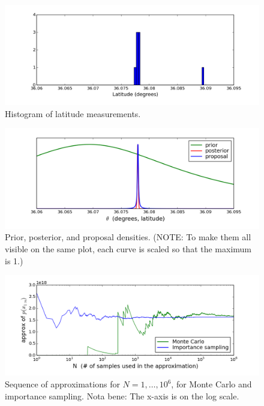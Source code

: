 \documentclass[12pt]{article}
\begin{document}
\begin{figure}
  \begin{center}
    \includegraphics[trim=0 0.75cm 0 0, clip, width=1\textwidth]{gps-histogram.png}
  \end{center}
  \caption{Histogram of latitude measurements.}
  \label{figure:gps-histogram}
\end{figure}

\begin{figure}
  \begin{center}
    \includegraphics[trim=0 0.65cm 0 0, clip, width=1\textwidth]{gps-curves.png}
  \end{center}
  \caption{Prior, posterior, and proposal densities. (NOTE: To make them all visible on the same plot, each curve is scaled so that the maximum is 1.)}
  \label{figure:gps-curves}
\end{figure}

\begin{figure}
  \begin{center}
    \includegraphics[trim=0 0.65cm 0 0, clip, width=1\textwidth]{gps-convergence.png}
  \end{center}
  \caption{Sequence of approximations for $N = 1,\dotsc,10^6$, for Monte Carlo and importance sampling. Nota bene: The x-axis is on the log scale.}
  \label{figure:gps-convergence}
\end{figure}
\end{document}
